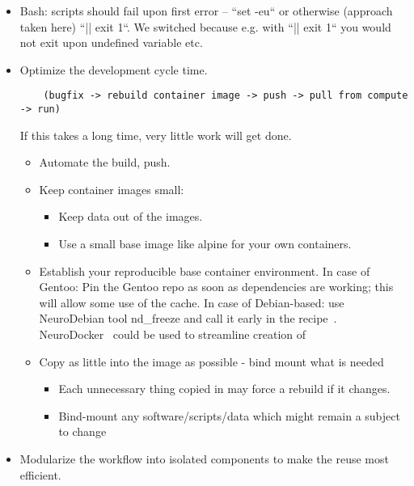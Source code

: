 \begin{itemize}
\item Bash: scripts should fail upon first error -- ``set -eu`` or otherwise (approach taken here) ``|| exit 1``.
  We switched because e.g. with ``|| exit 1`` you would not exit upon undefined variable etc.
  \item Optimize the development cycle time.
    \begin{lstlisting}
    (bugfix -> rebuild container image -> push -> pull from compute -> run)
    \end{lstlisting}
    If this takes a long time, very little work will get done.

    \begin{itemize}
      \item Automate the build, push.
      \item Keep container images small:
        \begin{itemize}
          \item Keep data out of the images.
          \item Use a small base image like alpine for your own containers.
        \end{itemize}
      \item Establish your reproducible base container environment.
        In case of Gentoo: Pin the Gentoo repo as soon as dependencies are working; this will allow some use of the cache.
        In case of Debian-based: use NeuroDebian tool nd\_freeze and call it early in the recipe~\supercite{TODO}.
        NeuroDocker~\supercite{TODO} could be used to streamline creation of 
      \item Copy as little into the image as possible - bind mount what is needed
        \begin{itemize}
        \item Each unnecessary thing copied in may force a rebuild if it changes.
        \item Bind-mount any software/scripts/data which might remain a subject to change
        \end{itemize}
    \end{itemize}

  \item Modularize the workflow into isolated components to make the reuse most efficient.


\end{itemize}
